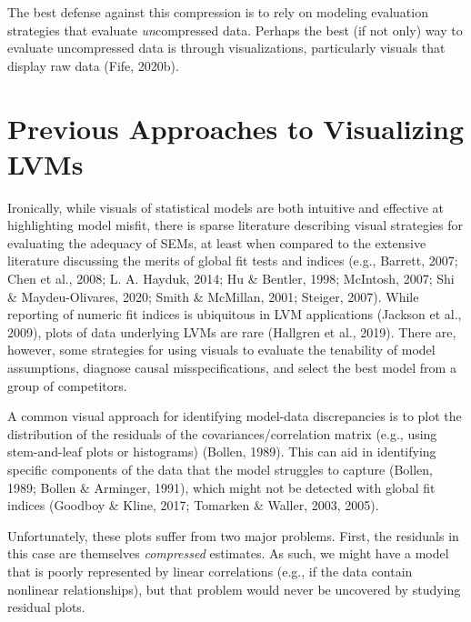 \documentclass[
  english,
  doc]{apa6}
\begin{document}
The best defense against this compression is to rely on modeling evaluation strategies that evaluate \emph{un}compressed data. Perhaps the best (if not only) way to evaluate uncompressed data is through visualizations, particularly visuals that display raw data (Fife, 2020b).

\hypertarget{previous-approaches-to-visualizing-lvms}{%
\section{Previous Approaches to Visualizing LVMs}\label{previous-approaches-to-visualizing-lvms}}

Ironically, while visuals of statistical models are both intuitive and effective at highlighting model misfit, there is sparse literature describing visual strategies for evaluating the adequacy of SEMs, at least when compared to the extensive literature discussing the merits of global fit tests and indices (e.g., Barrett, 2007; Chen et al., 2008; L. A. Hayduk, 2014; Hu \& Bentler, 1998; McIntosh, 2007; Shi \& Maydeu-Olivares, 2020; Smith \& McMillan, 2001; Steiger, 2007). While reporting of numeric fit indices is ubiquitous in LVM applications (Jackson et al., 2009), plots of data underlying LVMs are rare (Hallgren et al., 2019). There are, however, some strategies for using visuals to evaluate the tenability of model assumptions, diagnose causal misspecifications, and select the best model from a group of competitors.

A common visual approach for identifying model-data discrepancies is to plot the distribution of the residuals of the covariances/correlation matrix (e.g., using stem-and-leaf plots or histograms) (Bollen, 1989). This can aid in identifying specific components of the data that the model struggles to capture (Bollen, 1989; Bollen \& Arminger, 1991), which might not be detected with global fit indices (Goodboy \& Kline, 2017; Tomarken \& Waller, 2003, 2005).

Unfortunately, these plots suffer from two major problems. First, the residuals in this case are themselves \emph{compressed} estimates. As such, we might have a model that is poorly represented by linear correlations (e.g., if the data contain nonlinear relationships), but that problem would never be uncovered by studying residual plots.
\end{document}
